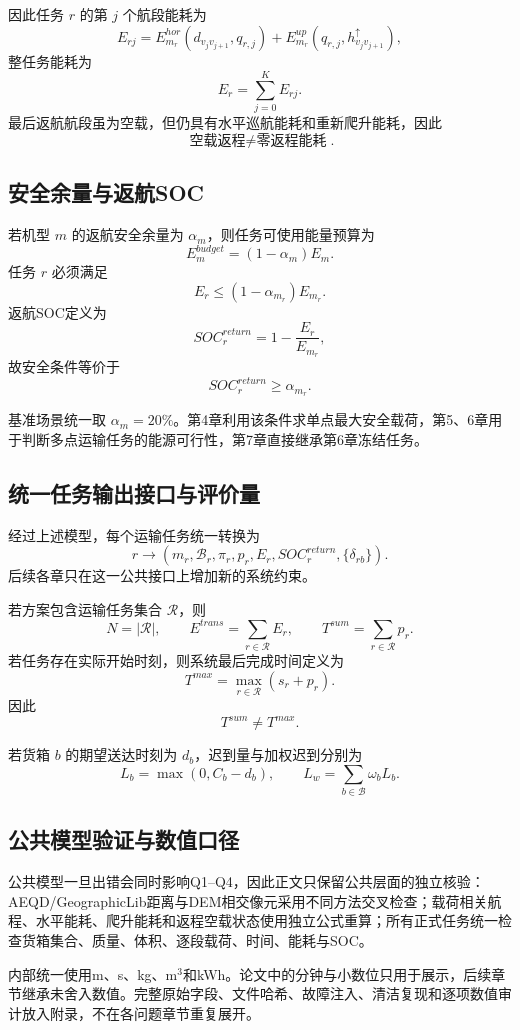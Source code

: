 \documentclass[UTF8,a4paper,12pt]{ctexart}
\begin{document}
因此任务 $r$ 的第 $j$ 个航段能耗为
\[
E_{rj}
=
E_{m_r}^{hor}
(d_{v_jv_{j+1}},q_{r,j})
+
E_{m_r}^{up}
(q_{r,j},h_{v_jv_{j+1}}^\uparrow),
\]
整任务能耗为
\[
E_r=\sum_{j=0}^{K}E_{rj}.
\]
最后返航航段虽为空载，但仍具有水平巡航能耗和重新爬升能耗，因此
\[
\boxed{\text{空载返程}\neq\text{零返程能耗}}.
\]

\subsection{安全余量与返航SOC}

若机型 $m$ 的返航安全余量为 $\alpha_m$，则任务可使用能量预算为
\[
E_m^{budget}=(1-\alpha_m)E_m.
\]
任务 $r$ 必须满足
\[
E_r\le(1-\alpha_{m_r})E_{m_r}.
\]
返航SOC定义为
\[
SOC_r^{return}
=
1-\frac{E_r}{E_{m_r}},
\]
故安全条件等价于
\[
SOC_r^{return}\ge\alpha_{m_r}.
\]

基准场景统一取 $\alpha_m=20\%$。第4章利用该条件求单点最大安全载荷，第5、6章用于判断多点运输任务的能源可行性，第7章直接继承第6章冻结任务。

\subsection{统一任务输出接口与评价量}

经过上述模型，每个运输任务统一转换为
\[
r
\longrightarrow
\left(
m_r,\mathcal B_r,\pi_r,p_r,E_r,SOC_r^{return},\{\delta_{rb}\}
\right).
\]
后续各章只在这一公共接口上增加新的系统约束。

若方案包含运输任务集合 $\mathcal R$，则
\[
N=|\mathcal R|,
\qquad
E^{trans}=\sum_{r\in\mathcal R}E_r,
\qquad
T^{sum}=\sum_{r\in\mathcal R}p_r.
\]
若任务存在实际开始时刻，则系统最后完成时间定义为
\[
T^{max}
=
\max_{r\in\mathcal R}(s_r+p_r).
\]
因此
\[
\boxed{T^{sum}\neq T^{max}}.
\]

若货箱 $b$ 的期望送达时刻为 $d_b$，迟到量与加权迟到分别为
\[
L_b=\max(0,C_b-d_b),
\qquad
L_w=\sum_{b\in\mathcal B}\omega_bL_b.
\]

\subsection{公共模型验证与数值口径}

公共模型一旦出错会同时影响Q1--Q4，因此正文只保留公共层面的独立核验：AEQD/GeographicLib距离与DEM相交像元采用不同方法交叉检查；载荷相关航程、水平能耗、爬升能耗和返程空载状态使用独立公式重算；所有正式任务统一检查货箱集合、质量、体积、逐段载荷、时间、能耗与SOC。

内部统一使用m、s、kg、m$^3$和kWh。论文中的分钟与小数位只用于展示，后续章节继承未舍入数值。完整原始字段、文件哈希、故障注入、清洁复现和逐项数值审计放入附录，不在各问题章节重复展开。
\end{document}
